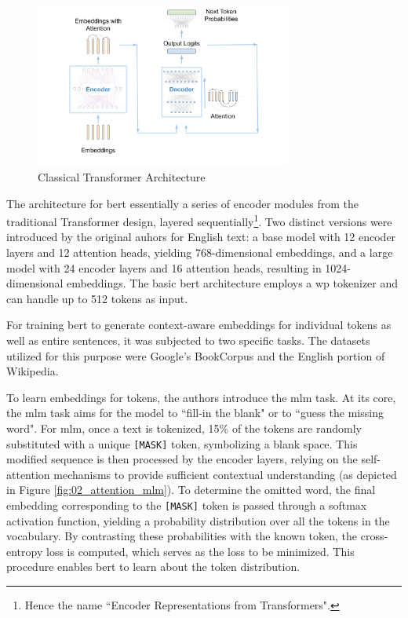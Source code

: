 \begin{figure}
    \centering
    \includegraphics[width=0.75\textwidth]{Figures/02/02_transformer.png}
    \caption{Classical Transformer Architecture}
    \label{fig:02_transformer_architecture}
\end{figure}







\label{02_training_bert}

The architecture for \gls{bert}  essentially a series of encoder modules from the traditional Transformer design, layered sequentially\footnote{Hence the name ``Encoder Representations from Transformers".}. 
Two distinct versions were introduced by the original auhors for English text: a base model with 12 encoder layers and 12 attention heads, yielding 768-dimensional embeddings, and a large model with 24 encoder layers and 16 attention heads, resulting in 1024-dimensional embeddings. The basic \gls{bert} architecture employs a \gls{wp} tokenizer and can handle up to 512 tokens as input.

For training \gls{bert} to generate context-aware embeddings for individual tokens as well as entire sentences, it was subjected to two specific tasks. The datasets utilized for this purpose were Google's BookCorpus and the English portion of Wikipedia.

\label{02_mlm}

To learn embeddings for tokens, the authors introduce the \gls{mlm} task.
At its core, the \gls{mlm} task aims for the model to ``fill-in the blank" or to ``guess the missing word". For \gls{mlm}, once a text is tokenized, 15\% of the tokens are randomly substituted with a unique \texttt{[MASK]} token, symbolizing a blank space. This modified sequence is then processed by the encoder layers, relying on the self-attention mechanisms to provide sufficient contextual understanding (as depicted in Figure \ref{fig:02_attention_mlm}). To determine the omitted word, the final embedding corresponding to the \texttt{[MASK]} token is passed through a \gls{softmax} activation function, yielding a probability distribution over all the tokens in the vocabulary. By contrasting these probabilities with the known token, the cross-entropy loss is computed, which serves as the loss to be minimized. This procedure enables \gls{bert} to learn about the token distribution.



